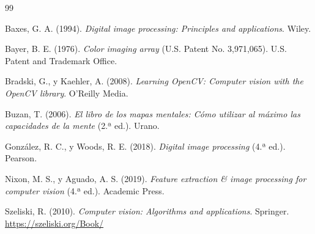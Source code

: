 \documentclass[12pt,letterpaper]{article}
\begin{document}
\begin{thebibliography}{99}

Baxes, G. A. (1994). \textit{Digital image processing: Principles and applications}.
Wiley.

Bayer, B. E. (1976). \textit{Color imaging array} (U.S. Patent No. 3,971,065).
U.S. Patent and Trademark Office.

Bradski, G., y Kaehler, A. (2008). \textit{Learning OpenCV: Computer vision with the
OpenCV library}. O'Reilly Media.

Buzan, T. (2006). \textit{El libro de los mapas mentales: Cómo utilizar al máximo las
capacidades de la mente} (2.ª ed.). Urano.

González, R. C., y Woods, R. E. (2018). \textit{Digital image processing} (4.ª ed.).
Pearson.

Nixon, M. S., y Aguado, A. S. (2019). \textit{Feature extraction \& image processing
for computer vision} (4.ª ed.). Academic Press.

Szeliski, R. (2010). \textit{Computer vision: Algorithms and applications}.
Springer. \url{https://szeliski.org/Book/}

\end{thebibliography}
\end{document}
